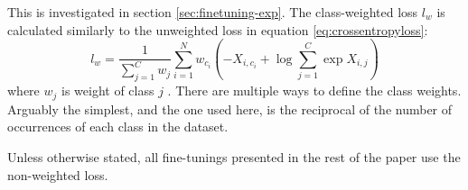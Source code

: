 \documentclass[main.tex]{subfiles}
\begin{document}
This is investigated in section \ref{sec:finetuning-exp}.
The class-weighted loss $ l_w $ is calculated similarly to the unweighted loss in equation \eqref{eq:crossentropyloss}:
\begin{equation}\label{eq:w-crossentropyloss}
    l_w = \frac{1}{\sum_{j=1}^{C} w_j}
    \sum_{i=1}^N w_{c_i} \left(
        -X_{i, c_i} + \log \sum_{j=1}^C \exp X_{i, j}
    \right)
\end{equation}
where $ w_j $ is weight of class $ j $ \cite{pytorchcel}.
There are multiple ways to define the class weights.
Arguably the simplest, and the one used here, is the reciprocal of the number of occurrences of each class in the dataset.

Unless otherwise stated, all fine-tunings presented in the rest of the paper use the non-weighted loss.
\end{document}
